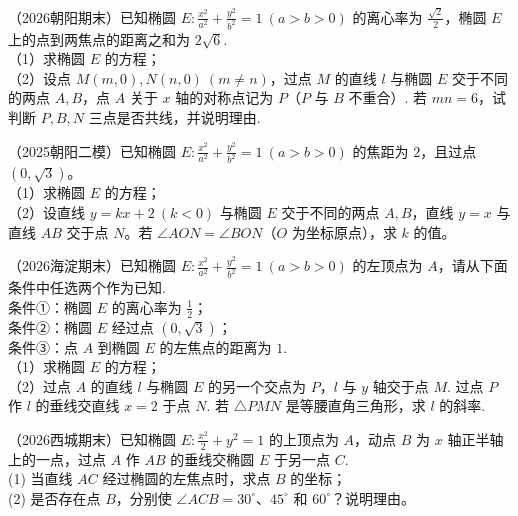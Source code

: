 \begin{example} %
（2026朝阳期末）已知椭圆 $E:\frac{x^2}{a^2}+\frac{y^2}{b^2}=1\ (a>b>0)$ 的离心率为 $\frac{\sqrt{2}}{2}$，椭圆 $E$ 上的点到两焦点的距离之和为 $2\sqrt{6}$.\\
（1）求椭圆 $E$ 的方程；\\
（2）设点 $M(m,0),N(n,0)\ (m\neq n)$，过点 $M$ 的直线 $l$ 与椭圆 $E$ 交于不同的两点 $A,B$，点 $A$ 关于 $x$ 轴的对称点记为 $P$（$P$ 与 $B$ 不重合）. 若 $mn=6$，试判断 $P,B,N$ 三点是否共线，并说明理由.
\end{example}

\begin{example} %
（2025朝阳二模）已知椭圆 $E:\frac{x^2}{a^2}+\frac{y^2}{b^2}=1\ (a>b>0)$ 的焦距为 $2$，且过点 $(0,\sqrt{3})$。\\
（1）求椭圆 $E$ 的方程；\\
（2）设直线 $y=kx+2\ (k<0)$ 与椭圆 $E$ 交于不同的两点 $A,B$，直线 $y=x$ 与直线 $AB$ 交于点 $N$。若 $\angle AON=\angle BON$（$O$ 为坐标原点），求 $k$ 的值。
\end{example}

\begin{example} %
（2026海淀期末）已知椭圆 $E:\frac{x^2}{a^2}+\frac{y^2}{b^2}=1\ (a>b>0)$ 的左顶点为 $A$，请从下面条件中任选两个作为已知.\\
条件①：椭圆 $E$ 的离心率为 $\frac{1}{2}$；\\
条件②：椭圆 $E$ 经过点 $(0,\sqrt{3})$；\\
条件③：点 $A$ 到椭圆 $E$ 的左焦点的距离为 $1$.\\
（1）求椭圆 $E$ 的方程；\\
（2）过点 $A$ 的直线 $l$ 与椭圆 $E$ 的另一个交点为 $P$，$l$ 与 $y$ 轴交于点 $M$. 过点 $P$ 作 $l$ 的垂线交直线 $x=2$ 于点 $N$. 若 $\triangle PMN$ 是等腰直角三角形，求 $l$ 的斜率.
\end{example}

\begin{example} %
（2026西城期末）已知椭圆 $E:\frac{x^2}{2} + y^2 = 1$ 的上顶点为 $A$，动点 $B$ 为 $x$ 轴正半轴上的一点，过点 $A$ 作 $AB$ 的垂线交椭圆 $E$ 于另一点 $C$.\\
(1) 当直线 $AC$ 经过椭圆的左焦点时，求点 $B$ 的坐标；\\
(2) 是否存在点 $B$，分别使 $\angle ACB = 30^{\circ}$、$45^{\circ}$ 和 $60^{\circ}$？说明理由。 

\end{example}

